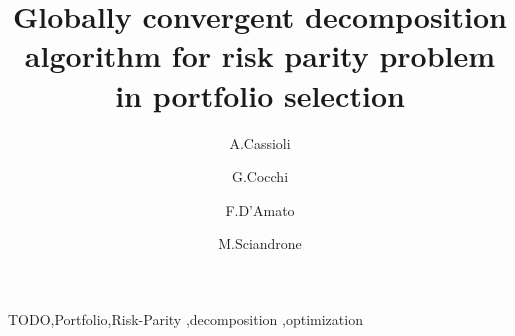 \documentclass[preprint,12pt]{elsarticle}
\begin{document}
\begin{frontmatter}



\title{Globally convergent decomposition algorithm for risk parity problem in portfolio selection}


\author[mosek]{A.Cassioli}
\author[firenze]{G.Cocchi}
\author[firenze]{F.D'Amato}
\author[firenze]{M.Sciandrone}

\address[mosek]{MOSEK ApS, Copenhagen, Denmark}
\address[firenze]{Dipartimento di Ingegneria dell'Informazione, Università di Firenze, Firenze, Italy}



\begin{abstract}

\end{abstract}

\begin{keyword}
TODO\sep Portfolio\sep Risk-Parity \sep decomposition \sep optimization



\end{keyword}

\end{frontmatter}
\end{document}
